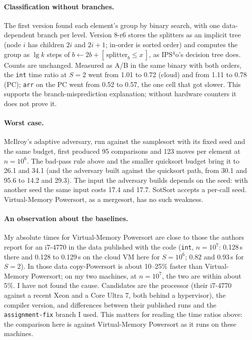 \documentclass[10pt,a4paper]{article}
\begin{document}
\paragraph{Classification without branches.} The first version found each element's group by
binary search, with one data-dependent branch per level. Version 8-r6 stores the splitters as an
implicit tree (node $i$ has children $2i$ and $2i+1$; in-order is sorted order) and computes the
group as $\lg k$ steps of $b\leftarrow 2b+[\,\text{splitter}_b\le x\,]$, as IPS$^4$o's decision
tree does. Counts are unchanged. Measured as A/B in the same binary with both orders, the
\texttt{int} time ratio at $S=2$ went from 1.01 to 0.72 (cloud) and from 1.11 to 0.78 (PC);
\texttt{arr} on the PC went from 0.52 to 0.57, the one cell that got slower. This supports the
branch-misprediction explanation; without hardware counters it does not prove it.

\paragraph{Worst case.} McIlroy's adaptive adversary, run against the samplesort with its fixed
seed and the same budget, first produced 95 comparisons and 123 moves per element at $n=10^6$.
The bad-pass rule above and the smaller quicksort budget bring it to 26.1 and 34.1 (and the
adversary built against the quicksort path, from 30.1 and 95.6 to 14.2 and 29.3). The input the
adversary builds depends on the seed: with another seed the same input costs 17.4 and 17.7.
SotSort accepts a per-call seed. Virtual-Memory Powersort, as a mergesort, has no such weakness.

\paragraph{An observation about the baselines.} My absolute times for Virtual-Memory
Powersort are close to those the authors report for an i7-4770 in the data published with the
code (\texttt{int}, $n=10^7$: 0.128\,s there and 0.128 to 0.129\,s on the cloud VM here for
$S=10^6$; 0.82 and 0.93\,s for $S=2$). In those data copy-Powersort is about 10--25\% faster
than Virtual-Memory Powersort; on my two machines, at $n=10^7$,
the two are within about 5\%. I have not found the cause. Candidates are the processor
(their i7-4770 against a recent Xeon and a Core Ultra 7, both behind a hypervisor), the
compiler version, and differences between their published runs and the \texttt{assignment-fix}
branch I used. This matters for reading the time ratios above: the comparison here is against
Virtual-Memory Powersort as it runs on these machines.
\end{document}
